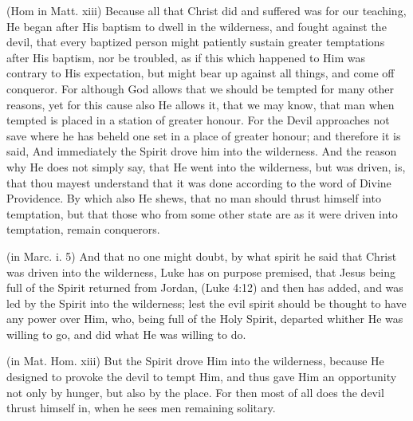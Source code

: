  

 (Hom in Matt. xiii) Because all that Christ did and suffered was for our teaching, He began after His baptism to dwell in the wilderness, and fought against the devil, that every baptized person might patiently sustain greater temptations after His baptism, nor be troubled, as if this which happened to Him was contrary to His expectation, but might bear up against all things, and come off conqueror. For although God allows that we should be tempted for many other reasons, yet for this cause also He allows it, that we may know, that man when tempted is placed in a station of greater honour. For the Devil approaches not save where he has beheld one set in a place of greater honour; and therefore it is said, And immediately the Spirit drove him into the wilderness. And the reason why He does not simply say, that He went into the wilderness, but was driven, is, that thou mayest understand that it was done according to the word of Divine Providence. By which also He shews, that no man should thrust himself into temptation, but that those who from some other state are as it were driven into temptation, remain conquerors.

 (in Marc. i. 5) And that no one might doubt, by what spirit he said that Christ was driven into the wilderness, Luke has on purpose premised, that Jesus being full of the Spirit returned from Jordan, (Luke 4:12) and then has added, and was led by the Spirit into the wilderness; lest the evil spirit should be thought to have any power over Him, who, being full of the Holy Spirit, departed whither He was willing to go, and did what He was willing to do.

 (in Mat. Hom. xiii) But the Spirit drove Him into the wilderness, because He designed to provoke the devil to tempt Him, and thus gave Him an opportunity not only by hunger, but also by the place. For then most of all does the devil thrust himself in, when he sees men remaining solitary.

